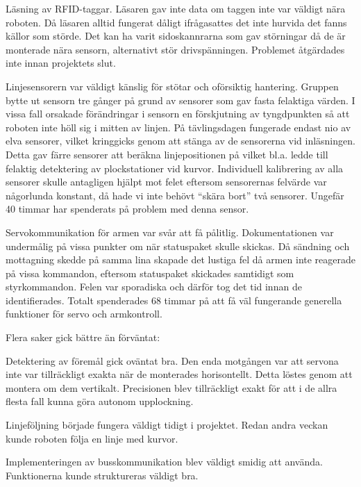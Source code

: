 \documentclass[a4paper,12pt]{article}
\begin{document}
\begin{packed_itemize}
\item Läsning av RFID-taggar. Läsaren gav inte data om taggen inte var väldigt nära roboten. Då läsaren alltid fungerat dåligt ifrågasattes det inte hurvida det fanns källor som störde. Det kan ha varit sidoskannrarna som gav störningar då de är monterade nära sensorn, alternativt stör drivspänningen. Problemet åtgärdades inte innan projektets slut.
\item Linjesensorern var väldigt känslig för stötar och oförsiktig hantering. Gruppen bytte ut sensorn tre gånger på grund av sensorer som gav fasta felaktiga värden. I vissa fall orsakade förändringar i sensorn en förskjutning av tyngdpunkten så att roboten inte höll sig i mitten av linjen. På tävlingsdagen fungerade endast nio av elva sensorer, vilket kringgicks genom att stänga av de sensorerna vid inläsningen. Detta gav färre sensorer att beräkna linjepositionen på vilket bl.a. ledde till felaktig detektering av plockstationer vid kurvor. Individuell kalibrering av alla sensorer skulle antagligen hjälpt mot felet eftersom sensorernas felvärde var någorlunda konstant, då hade vi inte behövt “skära bort” två sensorer. Ungefär 40 timmar har spenderats på problem med denna sensor.
\item Servokommunikation för armen var svår att få pålitlig. Dokumentationen var undermålig på vissa punkter om när statuspaket skulle skickas. Då sändning och mottagning skedde på samma lina skapade det lustiga fel då armen inte reagerade på vissa kommandon, eftersom statuspaket skickades samtidigt som styrkommandon. Felen var sporadiska och därför tog det tid innan de identifierades. Totalt spenderades 68 timmar på att få väl fungerande generella funktioner för servo och armkontroll.
\end{packed_itemize}

Flera saker gick bättre än förväntat:
\begin{packed_itemize}
\item Detektering av föremål gick oväntat bra. Den enda motgången var att servona inte var tillräckligt exakta när de monterades horisontellt. Detta löstes genom att montera om dem vertikalt. Precisionen blev tillräckligt exakt för att i de allra flesta fall kunna göra autonom upplockning.
\item Linjeföljning började fungera väldigt tidigt i projektet. Redan andra veckan kunde roboten följa en linje med kurvor.
\item Implementeringen av busskommunikation blev väldigt smidig att använda. Funktionerna kunde struktureras väldigt bra.
\end{packed_itemize}
\end{document}

